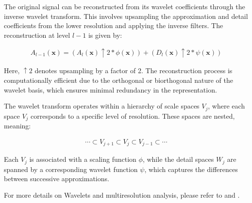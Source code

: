 

The original signal can be reconstructed from its wavelet coefficients through the inverse wavelet transform. This involves upsampling the approximation and detail coefficients from the lower resolution and applying the inverse filters. The reconstruction at level \( l-1 \) is given by:

\begin{align}
  A_{l-1}(\mathbf{x}) = \left( A_l(\mathbf{x}) \uparrow 2 * \phi(\mathbf{x}) \right) + \left( D_l(\mathbf{x}) \uparrow 2 * \psi(\mathbf{x}) \right)  
\end{align}

Here, \( \uparrow 2 \) denotes upsampling by a factor of 2. The reconstruction process is computationally efficient due to the orthogonal or biorthogonal nature of the wavelet basis, which ensures minimal redundancy in the representation.

The wavelet transform operates within a hierarchy of scale spaces \( V_j \), where each space \( V_j \) corresponds to a specific level of resolution. These spaces are nested, meaning:

\begin{align}
  \cdots \subset V_{j+1} \subset V_j \subset V_{j-1} \subset \cdots  
\end{align}

Each \( V_j \) is associated with a scaling function \( \phi \), while the detail spaces \( W_j \) are spanned by a corresponding wavelet function \( \psi \), which captures the differences between successive approximations.

For more details on Wavelets and multiresolution analysis, please refer to \cite{mallat1989theory} and \cite{GomesVelho2015FromFA}.




